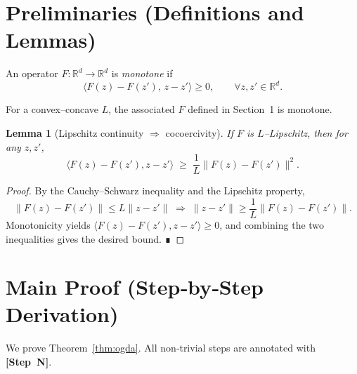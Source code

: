 \documentclass{article}
\newtheorem{lemma}{Lemma}
\begin{document}
\section*{Preliminaries (Definitions and Lemmas)}
\begin{definition}
An operator $F:\mathbb{R}^d\to\mathbb{R}^d$ is \emph{monotone} if
\[
\langle F(z)-F(z'),\,z-z'\rangle\ge0,\qquad\forall z,z'\in\mathbb{R}^d .
\]
\end{definition}
For a convex–concave $L$, the associated $F$ defined in Section~1 is monotone.

\begin{lemma}[Lipschitz continuity $\Rightarrow$ cocoercivity]\label{lem:coco}
If $F$ is $L$–Lipschitz, then for any $z,z'$,
\[
\langle F(z)-F(z'),z-z'\rangle\;\ge\;\frac{1}{L}\|F(z)-F(z')\|^2 .
\]
\end{lemma}
\begin{proof}
By the Cauchy–Schwarz inequality and the Lipschitz property,
\[
\|F(z)-F(z')\|\le L\|z-z'\|\;\Longrightarrow\;
\|z-z'\|\ge\frac{1}{L}\|F(z)-F(z')\|.
\]
Monotonicity yields $\langle F(z)-F(z'),z-z'\rangle\ge0$, and combining the two inequalities gives the desired bound. ∎
\end{proof}

\section*{Main Proof (Step‑by‑Step Derivation)}
We prove Theorem~\ref{thm:ogda}.  All non‑trivial steps are annotated with \textbf{[Step~N]}.
\end{document}

